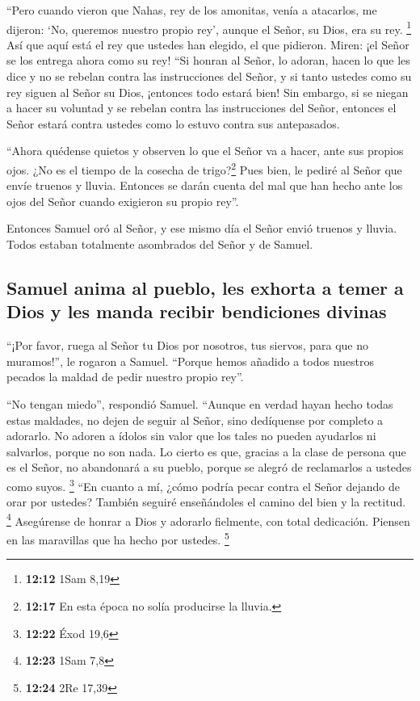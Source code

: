  ``Pero cuando vieron que Nahas, rey de los amonitas,
venía a atacarlos, me dijeron: `No, queremos nuestro propio rey', aunque
el Señor, su Dios, era su rey. \footnote{\textbf{12:12} 1Sam 8,19}
 Así que aquí está el rey que ustedes han elegido, el que
pidieron. Miren: ¡el Señor se los entrega ahora como su rey!
 ``Si honran al Señor, lo adoran, hacen lo que les dice y
no se rebelan contra las instrucciones del Señor, y si tanto ustedes
como su rey siguen al Señor su Dios, ¡entonces todo estará bien!
 Sin embargo, si se niegan a hacer su voluntad y se
rebelan contra las instrucciones del Señor, entonces el Señor estará
contra ustedes como lo estuvo contra sus antepasados.

 ``Ahora quédense quietos y observen lo que el Señor va a
hacer, ante sus propios ojos.  ¿No es el tiempo de la
cosecha de trigo?\footnote{\textbf{12:17} En esta época no solía
  producirse la lluvia.} Pues bien, le pediré al Señor que envíe truenos
y lluvia. Entonces se darán cuenta del mal que han hecho ante los ojos
del Señor cuando exigieron su propio rey''.

 Entonces Samuel oró al Señor, y ese mismo día el Señor
envió truenos y lluvia. Todos estaban totalmente asombrados del Señor y
de Samuel.

\hypertarget{samuel-anima-al-pueblo-les-exhorta-a-temer-a-dios-y-les-manda-recibir-bendiciones-divinas}{%
\subsection{Samuel anima al pueblo, les exhorta a temer a Dios y les
manda recibir bendiciones
divinas}\label{samuel-anima-al-pueblo-les-exhorta-a-temer-a-dios-y-les-manda-recibir-bendiciones-divinas}}

 ``¡Por favor, ruega al Señor tu Dios por nosotros, tus
siervos, para que no muramos!'', le rogaron a Samuel. ``Porque hemos
añadido a todos nuestros pecados la maldad de pedir nuestro propio
rey''.

 ``No tengan miedo'', respondió Samuel. ``Aunque en
verdad hayan hecho todas estas maldades, no dejen de seguir al Señor,
sino dedíquense por completo a adorarlo.  No adoren a
ídolos sin valor que los tales no pueden ayudarlos ni salvarlos, porque
no son nada.  Lo cierto es que, gracias a la clase de
persona que es el Señor, no abandonará a su pueblo, porque se alegró de
reclamarlos a ustedes como suyos. \footnote{\textbf{12:22} Éxod 19,6}
 ``En cuanto a mí, ¿cómo podría pecar contra el Señor
dejando de orar por ustedes? También seguiré enseñándoles el camino del
bien y la rectitud. \footnote{\textbf{12:23} 1Sam 7,8} 
Asegúrense de honrar a Dios y adorarlo fielmente, con total dedicación.
Piensen en las maravillas que ha hecho por ustedes. \footnote{\textbf{12:24}
  2Re 17,39}

